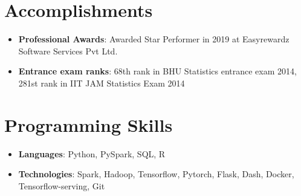 \documentclass[letterpaper,11pt]{article}
\newcommand{\resumeItem}[2]{
  \item\small{
    \textbf{#1}{: #2 \vspace{-2pt}}
  }
}
\newcommand{\resumeSubItem}[2]{\resumeItem{#1}{#2}\vspace{-4pt}}
\newcommand{\resumeSubHeadingListStart}{\begin{itemize}[leftmargin=*]}
\newcommand{\resumeSubHeadingListEnd}{\end{itemize}}
\begin{document}
%

\section{Accomplishments}
  \resumeSubHeadingListStart
    \resumeSubItem{Professional Awards}
      {Awarded Star Performer in 2019 at Easyrewardz Software Services Pvt Ltd.}
    \resumeSubItem{Entrance exam ranks}
      {68th rank in BHU Statistics entrance exam 2014, 281st rank in IIT JAM Statistics Exam 2014\vspace{-12pt}}  
  \resumeSubHeadingListEnd
%


\section{Programming Skills}
  \resumeSubHeadingListStart
    \resumeSubItem
      {Languages}{Python, PySpark, SQL, R}
    \resumeSubItem  
      {Technologies}{Spark, Hadoop, Tensorflow, Pytorch, Flask, Dash, Docker, Tensorflow-serving, Git}
  \resumeSubHeadingListEnd


\end{document}
